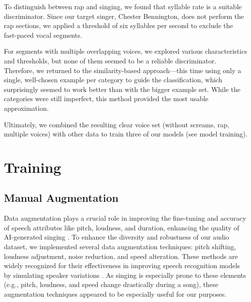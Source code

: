 \documentclass[a4paper]{article}
\begin{document}
To distinguish between rap and singing, we found that syllable rate is a suitable discriminator. Since our target singer, Chester Bennington, does not perform the rap sections, we applied a threshold of six syllables per second to exclude the fast-paced vocal segments.

For segments with multiple overlapping voices, we explored various characteristics and thresholds, but none of them seemed to be a reliable discriminator. Therefore, we returned to the similarity-based approach—this time using only a single, well-chosen example per category to guide the classification, which surprisingly seemed to work better than with the bigger example set. While the categories were still imperfect, this method provided the most usable approximation.

Ultimately, we combined the resulting clear voice set (without screams, rap, multiple voices) with other data to train three of our models (see model training).






\section{Training}

\subsection{Manual Augmentation}

Data augmentation plays a crucial role in improving the fine-tuning and accuracy of speech attributes like pitch, loudness, and duration, enhancing the quality of AI-generated singing \cite{Morrison2024}.
To enhance the diversity and robustness of our audio dataset, we implemented several data augmentation techniques: pitch shifting, loudness adjustment, noise reduction, and speed alteration. These methods are widely recognized for their effectiveness in improving speech recognition models by simulating speaker variations \cite{Morrison2024}. As singing is especially prone to these elements (e.g., pitch, loudness, and speed change drastically during a song), these augmentation techniques appeared to be especially useful for our purposes.
\end{document}
